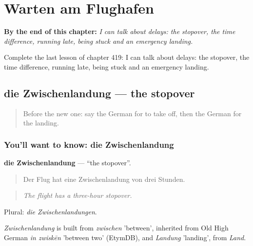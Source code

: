 
\chapter{Warten am Flughafen}
\label{ch:ge-warten-am-flughafen}

\begin{chapteropening}
\textbf{By the end of this chapter:} \emph{I can talk about delays: the stopover, the time difference, running late, being stuck and an emergency landing.}

Complete the last lesson of chapter 419: I can talk about delays: the stopover, the time difference, running late, being stuck and an emergency landing.
\end{chapteropening}

\section[die Zwischenlandung]{die Zwischenlandung — the stopover}

\label{lesson:GE-C419-zwischenlandung}



\begin{quote}
Before the new one: say the German for to take off, then the German for the landing.
\end{quote}

\subsection*{You'll want to know: die Zwischenlandung}
\textbf{die Zwischenlandung} — \textquotedblleft{}the stopover\textquotedblright{}.

\begin{quote}
Der Flug hat eine Zwischenlandung von drei Stunden.
\end{quote}

\begin{quote}
\emph{The flight has a three-hour stopover.}
\end{quote}

Plural: \emph{die Zwischenlandungen}.

\begin{cousinweb}
\emph{Zwischenlandung} is built from \emph{zwischen} 'between', inherited from Old High German \emph{in zwiskēn} 'between two' (EtymDB), and \emph{Landung} 'landing', from \emph{Land}.
\end{cousinweb}

